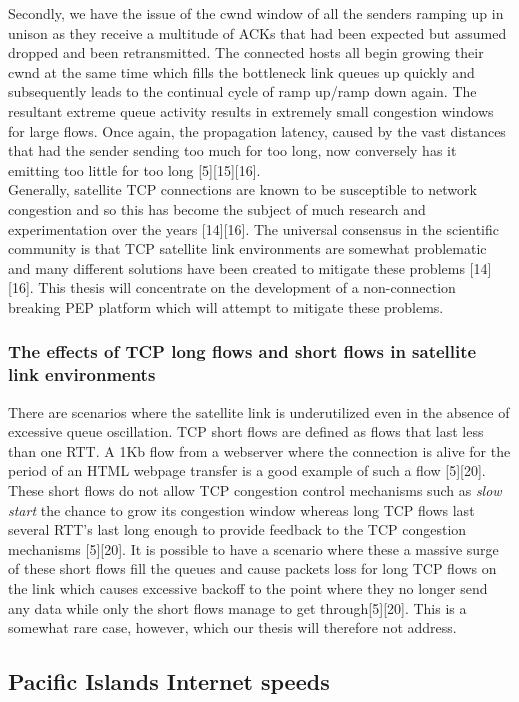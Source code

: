 \documentclass{uathesis}
\begin{document}
Secondly, we have the issue of the cwnd window of all the senders ramping up in unison as they receive a multitude of ACKs that had been expected but assumed dropped and been retransmitted. The connected hosts all begin growing their cwnd at the same time which fills the bottleneck link queues up quickly and subsequently leads to the continual cycle of ramp up/ramp down again. The resultant extreme queue activity results in extremely small congestion windows for large flows. Once again, the propagation latency, caused by the vast distances that had the sender sending too much for too long, now conversely has it emitting too little for too long [5][15][16]. \\

Generally, satellite TCP connections are known to be susceptible to network congestion and so this has become the subject of much research and experimentation over the years [14][16]. The universal consensus in the scientific community is that TCP satellite link environments are somewhat problematic and many different solutions have been created to mitigate these problems [14][16]. This thesis will concentrate on the development of a non-connection breaking PEP platform which will attempt to mitigate these problems.\\

\subsubsection*{The effects of TCP long flows and short flows in satellite link environments}
There are scenarios where the satellite link is underutilized even in the absence of excessive queue oscillation. TCP short flows are defined as flows that last less than one RTT. A 1Kb flow from a webserver where the connection is alive for the period of an HTML webpage transfer is a good example of such a flow [5][20]. These short flows do not allow TCP congestion control mechanisms such as \emph{slow start} the chance to grow its congestion window whereas long TCP flows last several RTT's last long enough to provide feedback to the TCP congestion mechanisms [5][20]. It is possible to have a scenario where these a massive surge of these short flows fill the queues and cause packets loss for long TCP flows on the link which causes excessive backoff to the point where they no longer send any data while only the short flows manage to get through[5][20]. This is a somewhat rare case, however, which our thesis will therefore not address.


\subsection{Pacific Islands Internet speeds}
\end{document}
